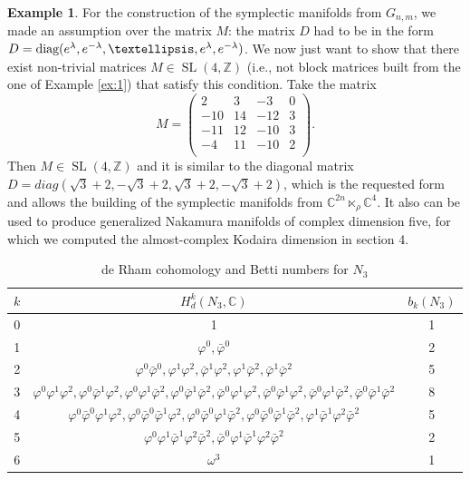 \documentclass[a4paper, 11pt]{amsart}
\theoremstyle{plain}
\theoremstyle{definition}
\newtheorem{esempio}{Example}[section]
\DeclareMathOperator{\SL}{SL}
\newcommand{\C}{\mathbb{C}}
\numberwithin{equation}{section}
\begin{document}
\begin{esempio}
    For the construction of the symplectic manifolds from $G_{n,m}$, we made an assumption over the matrix $M$: the matrix $D$ had to be in the form $D = \hbox{diag}(e^{\lambda}, e^{-\lambda}, \ldots, e^{\lambda}, e^{-\lambda})$. We now just want to show that there exist non-trivial matrices $M \in \SL(4,\mathbb{Z})$ (i.e., not block matrices built from the one of Example \ref{ex:1}) that satisfy this condition. Take the matrix
    \[M = \begin{pmatrix}
        2 & 3 & -3 & 0 \\
        -10 & 14 & -12 & 3 \\
        -11 & 12 & -10 & 3 \\
        -4 & 11 & -10 & 2 \\
    \end{pmatrix}.\]
    Then $M \in \SL(4,\mathbb{Z})$ and it is similar to the diagonal matrix $D = diag(\sqrt{3} + 2, -\sqrt{3} + 2, \sqrt{3} + 2, -\sqrt{3} + 2)$, which is the requested form and allows the building of the symplectic manifolds from $\C^{2n} \ltimes_{\rho} \C^{4}$. It also can be used to produce generalized Nakamura manifolds of complex dimension five, for which we computed the almost-complex Kodaira dimension in section 4.
\end{esempio}

 \begin{table}[H]
	\centering
	\begin{tabular}{|c|c|c|}
	\hline
	$ k $ & $ H_{d}^{k}(N_{3}, \C) $ & $ b_{k}(N_{3}) $ \\
	\hline
	0 & 1 & 1 \\
	\hline
	1 & $ \varphi^{0}, \bar\varphi^{0} $ & 2 \\
	\hline
	2 & $\varphi^{0}\bar\varphi^{0}, \varphi^{1}\varphi^{2}, \bar\varphi^{1}\varphi^{2}, \varphi^{1}\bar\varphi^{2}, \bar\varphi^{1}\bar\varphi^{2} $ & 5 \\
	\hline
	3 & $ \varphi^{0}\varphi^{1}\varphi^{2}, \varphi^{0}\bar\varphi^{1}\varphi^{2}, \varphi^{0}\varphi^{1}\bar\varphi^{2}, \varphi^{0}\bar\varphi^{1}\bar\varphi^{2}, \bar\varphi^{0}\varphi^{1}\varphi^{2}, \bar\varphi^{0}\bar\varphi^{1}\varphi^{2}, \bar\varphi^{0}\varphi^{1}\bar\varphi^{2}, \bar\varphi^{0}\bar\varphi^{1}\bar\varphi^{2}$ & 8 \\
	\hline
	4 & $ \varphi^{0}\bar\varphi^{0}\varphi^{1}\varphi^{2}, \varphi^{0}\bar\varphi^{0}\bar\varphi^{1}\varphi^{2}, \varphi^{0}\bar\varphi^{0}\varphi^{1}\bar\varphi^{2}, \varphi^{0}\bar\varphi^{0}\bar\varphi^{1}\bar\varphi^{2}, \varphi^{1}\bar\varphi^{1}\varphi^{2}\bar\varphi^{2}$ & 5 \\
	\hline
	5 & $ \varphi^{0}\varphi^{1}\bar\varphi^{1}\varphi^{2}\bar\varphi^{2}, \bar\varphi^{0}\varphi^{1}\bar\varphi^{1}\varphi^{2}\bar\varphi^{2}$ & 2 \\
	\hline
	6 & $ \omega^{3}$ & 1 \\
	\hline
	\end{tabular}
    \caption{de Rham cohomology and Betti numbers for $ N_{3} $}
    \label{table:1}
    \end{table}
\end{document}
